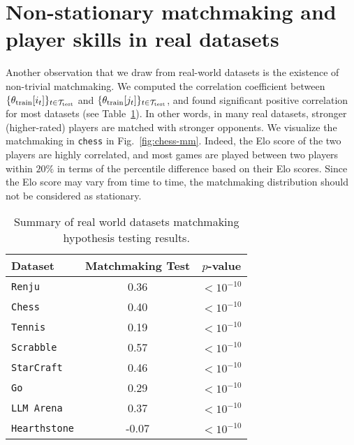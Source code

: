 \section{Non-stationary matchmaking and player skills in real datasets}
\label{sec:appendix-matchmaking}
Another observation that we draw from real-world datasets is the existence of non-trivial matchmaking. We computed the correlation coefficient between $\{\theta_{\rm train}[i_t]\}_{t\in \mathcal{T}_{\rm test}}$ and $\{\theta_{\rm train}[j_t]\}_{t\in \mathcal{T}_{\rm test}}$, and found significant positive correlation for most datasets (see Table~\ref{tab:mm_test}). In other words, in many real datasets, stronger (higher-rated) players are matched with stronger opponents. We visualize the matchmaking in \texttt{chess} in Fig.~\ref{fig:chess-mm}. Indeed, the Elo score of the two players are highly correlated, and most games are played between two players within $20\%$ in terms of the percentile difference based on their Elo scores. Since the Elo score may vary from time to time, the matchmaking distribution should not be considered as stationary. 




\begin{table}[ht]
\centering
\addtocounter{footnote}{+1}  
\begin{tabular}{|l|c|c|}
\hline
Dataset             & Matchmaking Test & $p$-value \\ \hline
\texttt{Renju}        & 0.36             & $<10^{-10}$          \\
\texttt{Chess}        & 0.40             & $<10^{-10}$          \\
\texttt{Tennis}       & 0.19             & $<10^{-10}$          \\
\texttt{Scrabble}           & 0.57             & $<10^{-10}$          \\
\texttt{StarCraft}          & 0.46             & $<10^{-10}$         \\
\texttt{Go}                  & 0.29             & $<10^{-10}$         \\ 
\texttt{LLM Arena}     & 0.37             & $<10^{-10}$          \\
\texttt{Hearthstone}     & -0.07             & $<10^{-10}$          \\
\hline
\end{tabular}
\caption{Summary of real world datasets matchmaking hypothesis testing results.}
\label{tab:mm_test}

\end{table}


